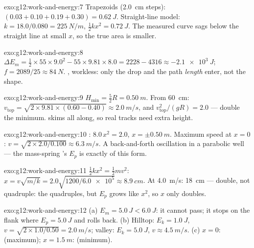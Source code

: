 \begin{solution}{exo:g12:work-and-energy:7}
Trapezoids (\qty{2.0}{cm} steps): $(0.03 + 0.10 + 0.19 + 0.30) =
\qty{0.62}{J}$. Straight-line model: $k = 18.0/0.080 =
\qty{225}{N/m}$, $\tfrac12 kx^2 = \qty{0.72}{J}$. The measured curve
sags below the straight line at small $x$, so the true area is
smaller.
\end{solution}

\begin{solution}{exo:g12:work-and-energy:8}
$\Delta E_m = \tfrac12 \times 55 \times 9.0^2 - 55 \times 9.81 \times
8.0 = 2228 - 4316 \approx \qty{-2.1e3}{J}$;
$f = 2089/25 \approx \qty{84}{N}$.  , 
workless: only the drop and the path \emph{length} enter, not the
shape.
\end{solution}

\begin{solution}{exo:g12:work-and-energy:9}
$H_{\min} = \tfrac52 R = \qty{0.50}{m}$. From \qty{60}{cm}:
$v_{\text{top}} = \sqrt{2 \times 9.81 \times (0.60 - 0.40)} \approx
\qty{2.0}{m/s}$, and $v_{\text{top}}^2/(gR) = 2.0$ --- double the
minimum.  skims  all along, so real tracks need extra
height.
\end{solution}

\begin{solution}{exo:g12:work-and-energy:10}
: $8.0\,x^2 = 2.0$, $x = \pm\qty{0.50}{m}$. Maximum
speed at $x = 0$: $v = \sqrt{2 \times 2.0/0.100} \approx
\qty{6.3}{m/s}$. A back-and-forth oscillation in a parabolic well ---
the mass-spring 's $E_p$ is exactly of this form.
\end{solution}

\begin{solution}{exo:g12:work-and-energy:11}
$\tfrac12 kx^2 = \tfrac12 mv^2$:
$x = v\sqrt{m/k} = 2.0\sqrt{1200/\num{6.0e5}} \approx \qty{8.9}{cm}$.
At \qty{4.0}{m/s}: \qty{18}{cm} --- double, not quadruple: the 
quadruples, but $E_p$ grows like $x^2$, so $x$ only doubles.
\end{solution}

\begin{solution}{exo:g12:work-and-energy:12}
(a) $E_m = \qty{5.0}{J} < \qty{6.0}{J}$: it cannot pass; it stops on
the flank where $E_p = \qty{5.0}{J}$ and rolls back. (b) Hilltop:
$E_k = \qty{1.0}{J}$, $v = \sqrt{2 \times 1.0/0.50} = \qty{2.0}{m/s}$;
valley: $E_k = \qty{5.0}{J}$, $v \approx \qty{4.5}{m/s}$. (c) $x = 0$:
 (maximum); $x = \qty{1.5}{m}$:  (minimum).
\end{solution}

